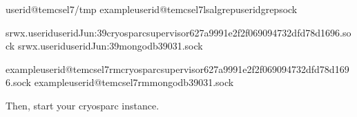 \documentclass[a4paper,11pt,english]{sphinxmanual}
\begin{document}
\begin{sphinxVerbatim}[commandchars=\\\{\}]
userid@tem\PYGZhy{}cs\PYGZhy{}el7\PYGZdl{}\PYGZgt{}/tmp
exampleuserid@tem\PYGZhy{}cs\PYGZhy{}el7\PYGZdl{}\PYGZgt{}ls\PYGZhy{}algrep\PYGZlt{}userid\PYGZgt{}grepsock

srwx\PYGZhy{}\PYGZhy{}\PYGZhy{}\PYGZhy{}\PYGZhy{}\PYGZhy{}.useriduseridJun:39cryosparc\PYGZhy{}supervisor\PYGZhy{}627a9991e2f2f069094732dfd78d1696.sock
srwx\PYGZhy{}\PYGZhy{}\PYGZhy{}\PYGZhy{}\PYGZhy{}\PYGZhy{}.useriduseridJun:39mongodb\PYGZhy{}39031.sock

exampleuserid@tem\PYGZhy{}cs\PYGZhy{}el7\PYGZdl{}\PYGZgt{}rmcryosparc\PYGZhy{}supervisor\PYGZhy{}627a9991e2f2f069094732dfd78d1696.sock
exampleuserid@tem\PYGZhy{}cs\PYGZhy{}el7\PYGZdl{}\PYGZgt{}rmmongodb\PYGZhy{}39031.sock
\end{sphinxVerbatim}

\sphinxAtStartPar
Then, start your cryosparc instance.
\end{document}
